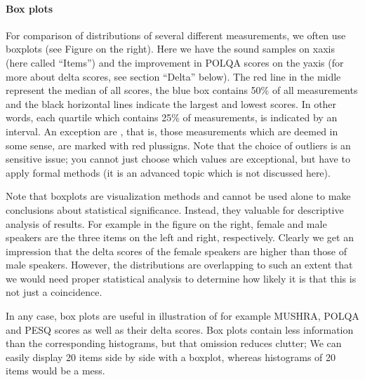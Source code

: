 \documentclass[letterpaper,10pt,english]{jupyterBook}
\begin{document}
\sphinxAtStartPar
{}


\paragraph{Box plots}
\label{\detokenize{Evaluation/Analysis_of_evaluation_results:box-plots}}
\sphinxAtStartPar
For comparison of distributions of several different measurements, we
often use box\sphinxhyphen{}plots (see Figure on the right). Here we have the sound
samples on x\sphinxhyphen{}axis (here called “Items”) and the improvement in POLQA
scores on the y\sphinxhyphen{}axis (for more about delta scores, see section “Delta”
below). The red line in the midle represent the median of all scores,
the blue box contains 50\% of all measurements and the black horizontal
lines indicate the largest and lowest scores. In other words, each
quartile which contains 25\% of measurements, is indicated by an
interval. An exception are , that is, those measurements which
are deemed  in some sense, are marked with red plus\sphinxhyphen{}signs.
Note that the choice of outliers is an sensitive issue; you cannot just
choose which values are exceptional, but have to apply formal methods
(it is an advanced topic which is not discussed here).

\sphinxAtStartPar
Note that box\sphinxhyphen{}plots are visualization methods and cannot be used alone
to make conclusions about statistical significance. Instead, they
valuable for descriptive analysis of results. For example in the figure
on the right, female and male speakers are the three items on the left
and right, respectively. Clearly we get an impression that the delta
scores of the female speakers are higher than those of male speakers.
However, the distributions are overlapping to such an extent that we
would need proper statistical analysis to determine how likely it is
that this is not just a coincidence.

\sphinxAtStartPar
In any case, box plots are useful in illustration of for example MUSHRA,
POLQA and PESQ scores as well as their delta scores. Box plots contain
less information than the corresponding histograms, but that omission
reduces clutter; We can easily display 20 items side by side with a
box\sphinxhyphen{}plot, whereas histograms of 20 items would be a mess.

\sphinxAtStartPar
{}
\end{document}
